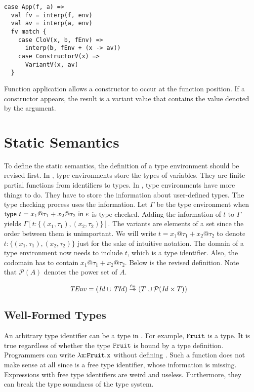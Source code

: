 \begin{verbatim}
case App(f, a) =>
  val fv = interp(f, env)
  val av = interp(a, env)
  fv match {
    case CloV(x, b, fEnv) =>
      interp(b, fEnv + (x -> av))
    case ConstructorV(x) =>
      VariantV(x, av)
  }
\end{verbatim}

Function application allows a constructor to occur at the function position.
If a constructor appears, the result is a variant value that
contains the value denoted by the argument.

\section{Static Semantics}

To define the static semantics, the definition of a type environment should be
revised first. In \plang, type environments store the types of variables. They
are finite partial functions from identifiers to types. In \lang, type environments
have more things to do. They have to store the information about user-defined types.
The type checking process uses the information. Let $\Gamma$ be the type
environment when $\textsf{type}\ t=x_1@\tau_1+x_2@\tau_2\ \textsf{in}\ e$ is
type-checked. Adding the information of $t$ to $\Gamma$ yields
$\Gamma[t:\{(x_1,\tau_1),(x_2,\tau_2)\}]$. The variants are elements of a set
since the order between them is unimportant. We will write
$t=x_1@\tau_1+x_2@\tau_2$ to denote $t:\{(x_1,\tau_1),(x_2,\tau_2)\}$ just for
the sake of intuitive notation.
The domain of a type environment now needs to include $t$, which is
a type identifier. Also, the codomain has to contain $x_1@\tau_1+x_2@\tau_2$.
Below is the revised definition. Note that $\mathcal{P}(A)$ denotes the power set
of $A$.

\[
  \embox{TEnv}=
(\embox{Id}\cup\embox{TId})\finto
(T\cup\mathcal{P}(\embox{Id}\times T))
\]

\subsection{Well-Formed Types}

An arbitrary type identifier can be a type in \lang. For example, $\texttt{Fruit}$ is a
type. It is true regardless of whether the type $\texttt{Fruit}$ is bound by a type
definition. Programmers can write $\lambda\texttt{x}{:}\texttt{Fruit}.\texttt{x}$ without defining
. Such a function does not make sense at all since  is a
free type identifier, whose information is missing. Expressions with free type
identifiers are weird and useless. Furthermore, they can break the type soundness of the
type system.

